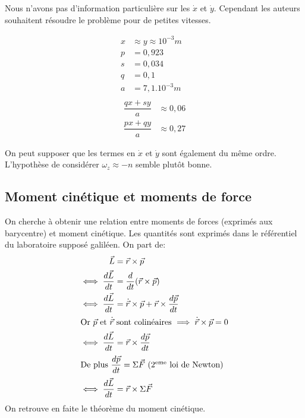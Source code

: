\documentclass[12pt,a4paper]{article}
\begin{document}
Nous n'avons pas d'information particulière sur les $\dot{x}$ et $\dot{y}$. Cependant les auteurs souhaitent résoudre le problème pour de petites vitesses.

\begin{multicols}{2}
	\noindent
\begin{align*}
	x&\approx y \approx 10^{-3}m&\\
	p&=0,923&\\
	s&=0,034&\\
	q&=0,1&\\
	a&=7,1.10^{-3}m&\\
\end{align*}
\columnbreak
\begin{align*}
	\dfrac{qx+sy}{a}&\approx0,06\\[2em]
	\dfrac{px+qy}{a}&\approx0,27
\end{align*}
\end{multicols}
\vspace*{-3em}
On peut supposer que les termes en $\dot{x}$ et $\dot{y}$ sont également du même ordre.\\
L'hypothèse de considérer $\omega_z\approx-n$ semble plutôt bonne.

\subsection*{Moment cinétique et moments de force}
On cherche à obtenir une relation entre moments de forces (exprimés aux barycentre) et moment cinétique. Les quantités sont exprimés dans le référentiel du laboratoire supposé galiléen.
On part de:
\begin{align*}
	\vec{L}					&=	\vec{r}\times \vec{p}\\
\iff\dfrac{d\vec{L}}{dt}	&=	\dfrac{d}{dt}(\vec{r}\times \vec{p})\\
\iff\dfrac{d\vec{L}}{dt}	&=	\dot{\vec{r}}\times \vec{p}+\vec{r}\times \dfrac{d\vec{p}}{dt}\\
\intertext{Or $\vec{p}$ et $\dot{\vec{r}}$ sont colinéaires $\implies \dot{\vec{r}}\times \vec{p} = 0$}
\iff\dfrac{d\vec{L}}{dt}	&=	\vec{r}\times \dfrac{d\vec{p}}{dt}\\
\intertext{De plus $\dfrac{d\vec{p}}{dt}=\Sigma\vec{F}$ (2$^{\mathrm{eme}}$ loi de Newton)}
\iff\dfrac{d\vec{L}}{dt}	&=	\vec{r}\times\Sigma\vec{F}
\end{align*}
On retrouve en faite le théorème du moment cinétique.
\end{document}
